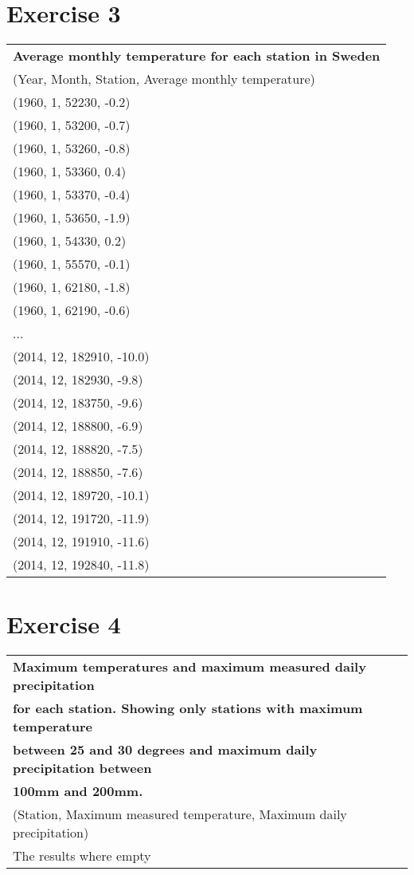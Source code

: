 \documentclass[a4paper,titlepage,12pt]{article}
\begin{document}
\section{Exercise 3}
\begin{tabular}{l}
\bf Average monthly temperature for each station in Sweden \\ 
(Year, Month, Station, Average monthly temperature) \\
\hline
(1960, 1, 52230, -0.2) \\ 
(1960, 1, 53200, -0.7) \\ 
(1960, 1, 53260, -0.8) \\
(1960, 1, 53360, 0.4)  \\
(1960, 1, 53370, -0.4) \\
(1960, 1, 53650, -1.9) \\
(1960, 1, 54330, 0.2)  \\
(1960, 1, 55570, -0.1) \\
(1960, 1, 62180, -1.8) \\
(1960, 1, 62190, -0.6) \\
... \\
(2014, 12, 182910, -10.0) \\
(2014, 12, 182930, -9.8)  \\
(2014, 12, 183750, -9.6)  \\
(2014, 12, 188800, -6.9)  \\
(2014, 12, 188820, -7.5)  \\
(2014, 12, 188850, -7.6)  \\
(2014, 12, 189720, -10.1) \\
(2014, 12, 191720, -11.9) \\
(2014, 12, 191910, -11.6) \\
(2014, 12, 192840, -11.8) \\
\end{tabular}

\section{Exercise 4}
\begin{tabular}{l}
  \bf Maximum temperatures and maximum measured daily precipitation \\
  \bf for each station. Showing only stations with maximum temperature \\
  \bf between 25 and 30 degrees and maximum daily precipitation between \\
  \bf 100mm and 200mm. \\
(Station, Maximum measured temperature, Maximum daily precipitation) \\
\hline
The results where empty \\ 
\end{tabular}
\end{document}

